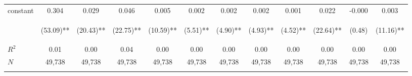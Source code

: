 \begin{tabular}{lccccccccccc}
\noalign{\smallskip}constant & 0.304 & 0.029 & 0.046 & 0.005 & 0.002 & 0.002 & 0.002 & 0.001 & 0.022 & -0.000 & 0.003\\
 & \begin{footnotesize}(53.09)**\end{footnotesize} & \begin{footnotesize}(20.43)**\end{footnotesize} & \begin{footnotesize}(22.75)**\end{footnotesize} & \begin{footnotesize}(10.59)**\end{footnotesize} & \begin{footnotesize}(5.51)**\end{footnotesize} & \begin{footnotesize}(4.90)**\end{footnotesize} & \begin{footnotesize}(4.93)**\end{footnotesize} & \begin{footnotesize}(4.52)**\end{footnotesize} & \begin{footnotesize}(22.64)**\end{footnotesize} & \begin{footnotesize}(0.48)\end{footnotesize} & \begin{footnotesize}(11.16)**\end{footnotesize}\\
\noalign{\smallskip}$R^2$ & 0.01 & 0.00 & 0.04 & 0.00 & 0.00 & 0.00 & 0.00 & 0.00 & 0.00 & 0.00 & 0.00\\
$N$ & 49,738 & 49,738 & 49,738 & 49,738 & 49,738 & 49,738 & 49,738 & 49,738 & 49,738 & 49,738 & 49,738\\
\noalign{\smallskip}\bottomrule\end{tabular}
